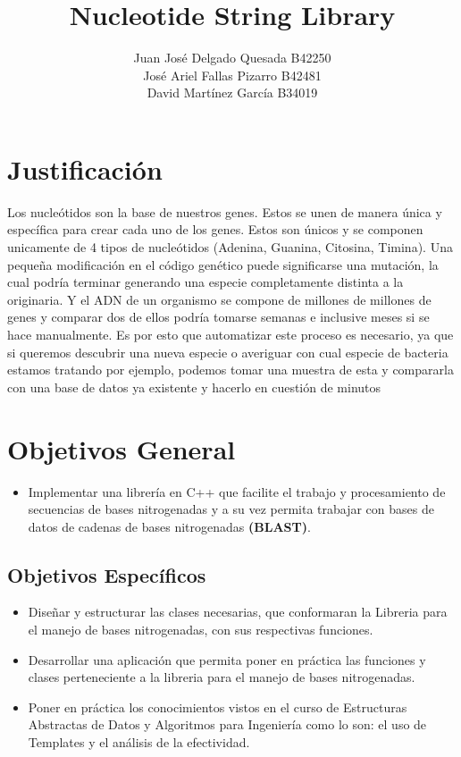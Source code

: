 \documentclass[10pt,a4paper,spanish] {article}
\begin{document}
\title{Nucleotide String Library}
\author{Juan José Delgado Quesada B42250\\José Ariel  Fallas Pizarro B42481\\David Martínez García B34019}

\maketitle

\section{Justificación}

Los nucleótidos son la base de nuestros genes. Estos se unen de manera única y específica para crear cada uno de los genes. Estos son únicos y se componen unicamente de 4 tipos de nucleótidos (Adenina, Guanina, Citosina, Timina). 
Una pequeña modificación en el código genético puede significarse una mutación, la cual podría terminar generando una especie completamente distinta a la originaria. 
Y el ADN de un organismo se compone de millones de millones de genes y comparar dos de ellos podría tomarse semanas e inclusive meses si se hace manualmente. Es por esto que automatizar este proceso es necesario, ya que si queremos descubrir una nueva especie o averiguar con cual especie de bacteria estamos tratando por ejemplo, podemos tomar una muestra de esta y compararla con una base de datos ya existente y hacerlo en cuestión de minutos

\section{Objetivos General}

\begin{itemize}
\item Implementar una librer\'ia en C++ que facilite el trabajo y procesamiento de secuencias de bases nitrogenadas y a su vez permita trabajar con bases de datos de cadenas de bases nitrogenadas \textbf{(BLAST)}.
\end{itemize}

\subsection{Objetivos Específicos}
\begin{itemize}
\item Diseñar y estructurar las clases necesarias, que conformaran la Libreria para el manejo de bases nitrogenadas, con sus respectivas funciones.
\item Desarrollar una aplicación que permita poner en práctica las funciones y clases perteneciente a la libreria para el manejo de bases nitrogenadas.
\item Poner en práctica los conocimientos vistos en el curso de Estructuras Abstractas de Datos y Algoritmos para Ingeniería como lo son: el uso de Templates y el análisis de la efectividad.

\end{itemize}
\end{document}
